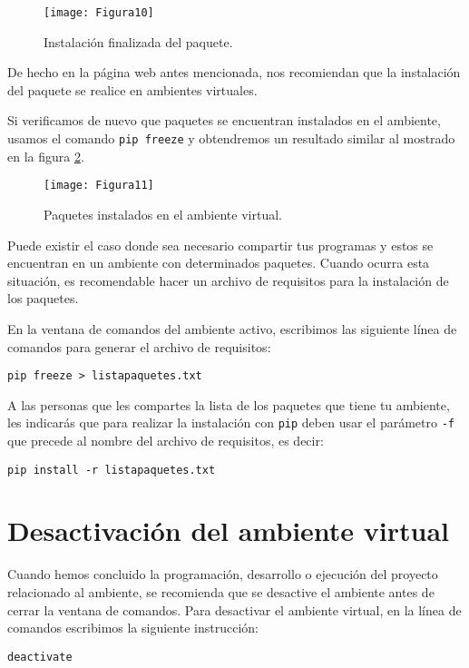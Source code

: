 \begin{figure}[H]
\centering
\texttt{[image: Figura10]}
\caption{Instalación finalizada del paquete.}
\label{fig:figura10}
\end{figure}
	
De hecho en la página web antes mencionada, nos recomiendan que la instalación del paquete se realice en ambientes virtuales.\bigskip
	
Si verificamos de nuevo que paquetes se encuentran instalados en el ambiente, usamos el comando \texttt{pip freeze} y obtendremos un resultado similar al mostrado en la figura \ref{fig:figura11}.
\begin{figure}[H]
\centering
\texttt{[image: Figura11]}
\caption{Paquetes instalados en el ambiente virtual.}
\label{fig:figura11}
\end{figure}
	
Puede existir el caso donde sea necesario compartir tus programas y estos se encuentran en un ambiente con determinados paquetes. Cuando ocurra esta situación, es recomendable hacer un archivo de requisitos para la instalación de los paquetes. \bigskip
	
En la ventana de comandos del ambiente activo, escribimos las siguiente línea de comandos para generar el archivo de requisitos:
\begin{verbatim}
pip freeze > listapaquetes.txt
\end{verbatim}
	
A las personas que les compartes la lista de los paquetes que tiene tu ambiente, les indicarás que para realizar la instalación con \texttt{pip} deben usar el parámetro \texttt{-f} que precede al nombre del archivo de requisitos, es decir:
\begin{verbatim}
pip install -r listapaquetes.txt
\end{verbatim}
	
\section{Desactivación del ambiente virtual}
Cuando hemos concluido la programación, desarrollo o ejecución del proyecto relacionado al ambiente, se recomienda que se desactive el ambiente antes de cerrar la ventana de comandos. Para desactivar el ambiente virtual, en la línea de comandos escribimos la siguiente instrucción:
\begin{verbatim}
deactivate
\end{verbatim}
	
